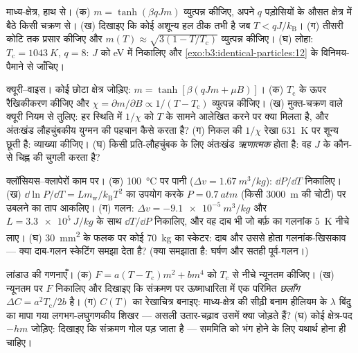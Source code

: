 \begin{exercise}[$\star\star$]\label{exo:b3:phase-transitions:5}
माध्य-क्षेत्र, हाथ से। (क) $m = \tanh(\beta qJm)$ व्युत्पन्न कीजिए,
अपने $q$ पड़ोसियों के औसत क्षेत्र में बैठे किसी चक्रण से। (ख)
दिखाइए कि कोई अशून्य हल ठीक तभी है जब $T < qJ/k_{\text{B}}$। (ग)
तीसरी कोटि तक प्रसार कीजिए और $m(T) \approx \sqrt{3(1 -
T/T_{\text{c}})}$ व्युत्पन्न कीजिए। (घ) लोहा: $T_{\text{c}} = \qty{1043}{K}$, $q =
8$: $J$ को eV में निकालिए और
\cref{exo:b3:identical-particles:12} के विनिमय-पैमाने से जाँचिए।
\end{exercise}

\begin{exercise}[$\star\star$]\label{exo:b3:phase-transitions:6}
क्यूरी--वाइस। कोई छोटा क्षेत्र जोड़िए: $m = \tanh[\beta(qJm + \mu B)]$।
(क) $T_{\text{c}}$ के ऊपर रैखिकीकरण कीजिए और $\chi = \partial
m/\partial B \propto 1/(T - T_{\text{c}})$ व्युत्पन्न कीजिए। (ख)
मुक्त-चक्रण वाले क्यूरी नियम से तुलिए: हर स्थिति में $1/\chi$ को $T$
के सामने आलेखित करने पर क्या मिलता है, और अंतःखंड लौहचुंबकीय
युग्मन की पहचान कैसे करता है? (ग) निकल की $1/\chi$ रेखा
\qty{631}{K} पर शून्य छूती है: व्याख्या कीजिए। (घ) किसी
प्रति-लौहचुंबक के लिए अंतःखंड \emph{ऋणात्मक} होता है: वह $J$ के
कौन-से चिह्न की चुगली करता है?
\end{exercise}

\begin{exercise}[$\star\star$]\label{exo:b3:phase-transitions:7}
क्लॉसियस--क्लापेरों काम पर। (क) \qty{100}{\celsius} पर पानी
($\Delta v = \qty{1.67}{m^3/kg}$): $\dd P/\dd T$ निकालिए। (ख)
$\dd\ln P/\dd T = Lm_{\text{w}}/k_{\text{B}}T^2$ का उपयोग करके
$P = \qty{0.7}{atm}$ (किसी \qty{3000}{m} की चोटी) पर उबलने का ताप
आकलिए। (ग) गलन: $\Delta v = \qty{-9.1e-5}{m^3/kg}$ और
$L = \qty{3.3e5}{J/kg}$ के साथ $\dd T/\dd P$ निकालिए, और वह दाब भी
जो बर्फ़ का गलनांक \qty{5}{K} नीचे लाए। (घ) \qty{30}{mm^2} के
फलक पर कोई \qty{70}{kg} का स्केटर: दाब और उससे होता गलनांक-खिसकाव
--- क्या दाब-गलन स्केटिंग समझा देता है? (क्या समझाता है: घर्षण और
सतही पूर्व-गलन।)
\end{exercise}

\begin{exercise}[$\star\star$]\label{exo:b3:phase-transitions:8}
लांडाउ की गणनाएँ। (क) $F = a(T - T_{\text{c}})m^2 +
bm^4$ को $T_{\text{c}}$ से नीचे न्यूनतम कीजिए। (ख) न्यूनतम पर $F$ निकालिए और
दिखाइए कि संक्रमण पर ऊष्माधारिता में एक परिमित \emph{छलाँग} $\Delta C =
a^2T_{\text{c}}/2b$ है। (ग) $C(T)$ का रेखाचित्र बनाइए:
माध्य-क्षेत्र की सीढ़ी बनाम हीलियम के $\lambda$ बिंदु का मापा गया
लगभग-लघुगणकीय शिखर --- असली उतार-चढ़ाव उसमें क्या जोड़ते हैं? (घ)
कोई क्षेत्र-पद $-hm$ जोड़िए: दिखाइए कि संक्रमण गोल पड़ जाता है ---
सममिति को भंग होने के लिए यथार्थ होना ही चाहिए।
\end{exercise}

